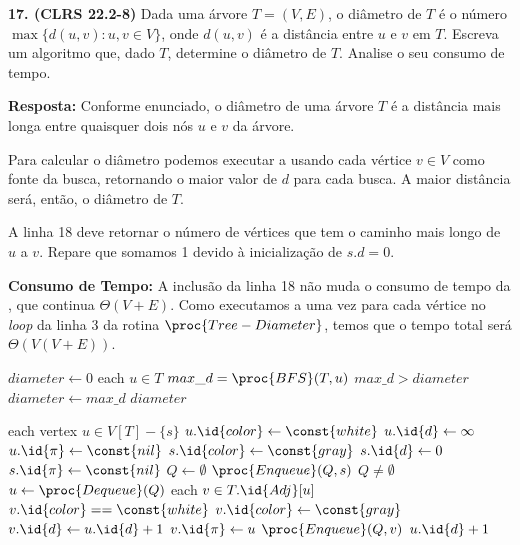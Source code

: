 
\noindent\textbf{17. (CLRS 22.2-8)} Dada uma árvore $T = (V, E)$, o diâmetro de $T$ é o número $\max\{d(u, v) : u, v \in V \}$, onde $d(u, v)$ é a distância entre $u$ e $v$ em $T$. Escreva um algoritmo que, dado $T$, determine o diâmetro de $T$. Analise o seu consumo de tempo.

\textbf{Resposta:} Conforme enunciado, o diâmetro de uma árvore $T$ é a distância mais longa entre quaisquer dois nós $u$ e $v$ da árvore.

Para calcular o diâmetro podemos executar a  usando cada vértice $v \in V$ como fonte da busca, retornando o maior valor de $d$ para cada busca. A maior distância será, então, o diâmetro de $T$.

A linha 18 deve retornar o número de vértices que tem o caminho mais longo de $u$ a $v$. Repare que somamos 1 devido à inicialização de $s.d = 0$.

\textbf{Consumo de Tempo:} A inclusão da linha 18 não muda o consumo de tempo da , que continua $\Theta(V + E)$. Como executamos a  uma vez para cada vértice no \textit{loop} da linha 3 da rotina $\proc{Tree-Diameter}$, temos que o tempo total será $\Theta(V(V + E))$.

\begin{codebox}
\li $diameter \gets 0$
\li \For each $u \in T$
\li \Do
        $max\_d = \proc{BFS}(T, u)$
\li     \If $max\_d > diameter$
\li     \Then 
            $diameter \gets max\_d$
        \End
    \End
\li \Return $diameter$
\end{codebox}

\begin{codebox}
\li \For each vertex $u \in V[T] - \{s\}$
\li \Do
        $u.\id{color} \gets \const{white}$
\li     $u.\id{d} \gets \infty$
\li     $u.\id{\pi} \gets \const{nil}$
    \End
\li $s.\id{color} \gets \const{gray}$
\li $s.\id{d} \gets 0$
\li $s.\id{\pi} \gets \const{nil}$
\li $Q \gets \emptyset$
\li $\proc{Enqueue}(Q, s)$
\li \While $Q \neq \emptyset$
\li \Do
        $u \gets \proc{Dequeue}(Q)$
\li     \For each $v \in T.\id{Adj}[u]$
\li     \Do
            \If $v.\id{color} == \const{white}$
\li         \Then 
                $v.\id{color} \gets \const{gray}$
\li             $v.\id{d} \gets u.\id{d} + 1$
\li             $v.\id{\pi} \gets u$
\li             $\proc{Enqueue}(Q, v)$
            \End
        \End
    \End
\li \Return $u.\id{d} + 1$
\end{codebox}